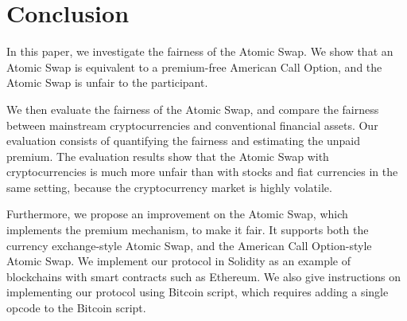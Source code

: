 \section{Conclusion}
\label{sec:conclusion}


In this paper, we investigate the fairness of the Atomic Swap.
We show that an Atomic Swap is equivalent to a premium-free American Call Option, and the Atomic Swap is unfair to the participant.

We then evaluate the fairness of the Atomic Swap, and compare the fairness between mainstream cryptocurrencies and conventional financial assets.
Our evaluation consists of quantifying the fairness and estimating the unpaid premium.
The evaluation results show that the Atomic Swap with cryptocurrencies is much more unfair than with stocks and fiat currencies in the same setting, because the cryptocurrency market is highly volatile.

Furthermore, we propose an improvement on the Atomic Swap, which implements the premium mechanism, to make it fair.
It supports both the currency exchange-style Atomic Swap, and the American Call Option-style Atomic Swap.
We implement our protocol in Solidity as an example of blockchains with smart contracts such as Ethereum.
We also give instructions on implementing our protocol using Bitcoin script, which requires adding a single opcode to the Bitcoin script.